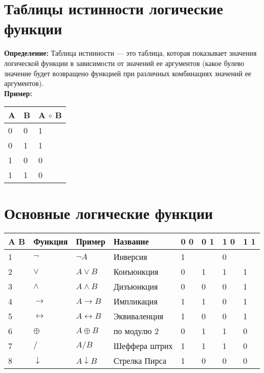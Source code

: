 \documentclass[../main.tex]{subfiles}
\begin{document}
\section{Таблицы истинности логические функции}
\textbf{Определение:
} Таблица истинности — это таблица, которая показывает значения логической функции в зависимости от значений ее аргументов (какое булево значение будет возвращено функцией при различных комбинациях значений ее аргументов). \\
\textbf{Пример:
} 
\begin{center}
    \begin{tabular}{ | m{3em} | m{3em}| m{3em} | } 
        \hline
        A& B & A $\circ$ B \\ 
        \hline
        0 & 0 & 1 \\ 
        \hline
        0 & 1 & 1 \\ 
        \hline
        1 & 0 & 0 \\ 
        \hline
        1 & 1 & 0 \\
        \hline 
    \end{tabular}
\end{center}

\section{Основные логические функции}
\begin{center}
    \begin{tabular}{| m{0.5em} | m{5em} | m{5em}| m{8em} | m{0.5em} | m{0.5em}| m{0.5em} | m{0.5em} | } 
        \hline
        A B & Функция & Пример & Название & 0 0 & 0 1 & 1 0 & 1 1\\ 
        \hline
        1 & $\lnot$ & $\lnot A$ & Инверсия & 1 &   & 0 &   \\ 
        \hline
        2 & $\lor$ &  $A \lor B$ & Конъюнкция & 0 & 1 & 1 & 1\\ 
        \hline
        3 & $\land$ & $A \land B$ & Дизъюнкция & 0 & 0 & 0 & 1\\ 
        \hline
        4 & $\rightarrow$ & $A \rightarrow B$ & Импликация & 1 & 1 & 0 & 1\\
        \hline
        5 & $\leftrightarrow$ & $A \leftrightarrow B$& Эквиваленция & 1 & 0 & 0 & 1\\
        \hline
        6 & $\oplus $ & $A \oplus B$& по модулю 2 & 0 & 1 & 1 & 0\\
        \hline
        7 & $ / $ & $A / B$& Шеффера штрих & 1 & 1 & 1 & 0\\
        \hline
        8 & $ \downarrow $ & $A \downarrow  B$& Стрелка Пирса & 1 & 0 & 0 & 0\\
        \hline
    \end{tabular}
\end{center}
\end{document}
